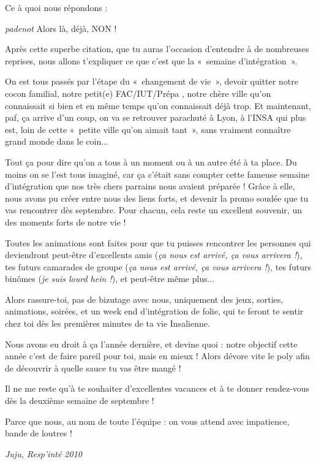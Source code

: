 \vspace{1em}

Ce à quoi nous répondons :

\begin{citationi}{ \emph{padenot} }
    Alors là, déjà, NON !
\end{citationi}

Après cette superbe citation, que tu auras l'occasion d'entendre à de
nombreuses reprises, nous allons t'expliquer ce que c'est que la «~semaine
d'intégration~».

On est tous passés par l'étape du «~changement de vie~», devoir quitter notre
cocon familial, notre petit(e) FAC/IUT/Prépa , notre chère ville qu'on
connaissait si bien et en même temps qu'on connaissait déjà trop.
Et maintenant, paf, ça arrive d'un coup, on va se retrouver parachuté
à Lyon, à l'INSA qui plus est, loin de cette «~petite ville qu'on aimait tant~»,
sans vraiment connaître grand monde dans le coin...

Tout ça pour dire qu'on a tous à un moment ou à un autre été à ta place.
Du moins on se l'est tous imaginé, car ça c'était sans compter cette fameuse
semaine d'intégration que nos très chers parrains nous avaient préparée ! Grâce
à elle, nous avons pu créer entre nous des liens forts, et devenir la promo
soudée que tu vas rencontrer dès septembre. Pour chacun,
cela reste un excellent souvenir, un des moments forts de notre vie !

Toutes les animations sont faites pour que tu puisses rencontrer les
personnes qui deviendront peut-être d'excellents amis (\emph{ça nous est arrivé,
ça vous arrivera !}), tes futurs camarades de groupe (\emph{ça nous est arrivé,
ça vous arrivera !}), tes futurs binômes (\emph{je suis lourd
hein !}), et peut-être même plus...

Alors rassure-toi, pas de bizutage avec nous, uniquement des jeux,
sorties, animations, soirées, et un week end d'intégration de folie, qui
te feront te sentir chez toi dès les premières minutes de ta vie
Insalienne.

Nous avons eu droit à ça l'année dernière, et devine quoi : notre objectif
cette année c'est de faire pareil pour toi, mais en mieux ! Alors dévore vite le poly afin
de découvrir à quelle sauce tu vas être mangé !

Il ne me reste qu'à te souhaiter d'excellentes vacances et à te donner
rendez-vous dès la deuxième semaine de septembre !

Parce que nous, au nom de toute l'équipe : on vous attend avec impatience, bande
de loutres !
\vspace{1cm}
\begin{flushright}
\emph{Juju, Resp'inté 2010}
\end{flushright}
\newpage
